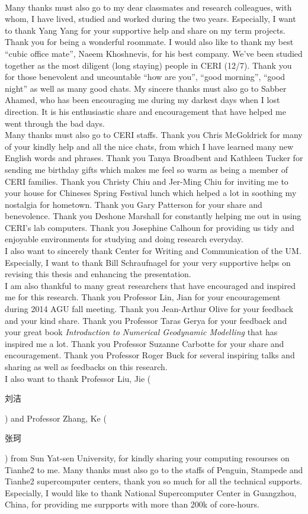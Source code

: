 \\
Many thanks must also go to my dear classmates and research colleagues, with whom, I have lived, studied and worked during the two years. Especially, I want to thank Yang Yang for your supportive help and share on my term projects. Thank you for being a wonderful roommate. I would also like to thank my best ``cubic office mate'', Naeem Khoshnevis, for his best company. We've been studied together as the most diligent (long staying) people in CERI (12/7). Thank you for those benevolent and uncountable ``how are you'', ``good morning'', ``good night'' as well as many good chats. My sincere thanks must also go to Sabber Ahamed, who has been encouraging me during my darkest days when I lost direction. It is his enthusiastic share and encouragement that have helped me went through the bad days. 
\\
Many thanks must also go to CERI staffs. Thank you Chris McGoldrick for many of your kindly help and all the nice chats, from which I have learned many new English words and phrases. Thank you Tanya Broadbent and Kathleen Tucker for sending me birthday gifts which makes me feel so warm as being a member of CERI families. Thank you Christy Chiu and Jer-Ming Chiu for inviting me to your house for Chineses Spring Festival lunch which helped a lot in soothing my nostalgia for hometown. Thank you Gary Patterson for your share and benevolence. Thank you Deshone Marshall for constantly helping me out in using CERI's lab computers. Thank you Josephine Calhoun for providing us tidy and enjoyable environments for studying and doing research everyday. 
\\
I also want to sincerely thank Center for Writing and Communication of the UM. Especially, I want to thank Bill Schraufnagel for your very supportive helps on revising this thesis and enhancing the presentation.
\\
I am also thankful to many great researchers that have encouraged and inspired me for this research. Thank you Professor Lin, Jian for your encouragement during 2014 AGU fall meeting. Thank you Jean-Arthur Olive for your feedback and your kind share. Thank you Professor Taras Gerya for your feedback and your great book \textit{Introduction to Numerical Geodynamic Modelling} that has inspired me a lot. Thank you Professor Suzanne Carbotte for your share and encouragement. Thank you Professor Roger Buck for several inspiring talks and sharing as well as feedbacks on this research.
\\
I also want to thank Professor Liu, Jie (\begin{CJK}{UTF8}{gbsn}刘洁\end{CJK}) and Professor Zhang, Ke (\begin{CJK}{UTF8}{gbsn}张珂\end{CJK}) from Sun Yat-sen University, for kindly sharing your computing resourses on Tianhe2 to me. Many thanks must also go to the staffs of Penguin, Stampede and Tianhe2 supercomputer centers, thank you so much for all the technical supports. Especially, I would like to thank National Supercomputer Center in Guangzhou, China, for providing me surpports with more than 200k of core-hours. 
